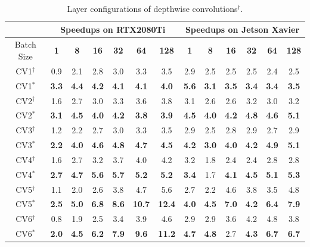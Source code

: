 \begin{table}[]
\setlength{\tabcolsep}{3.8pt}
\caption{Layer configurations of depthwise convolutions$^{\dag}$.}
\label{tab:dwconv}
\begin{threeparttable}
\begin{tabular}{c|cccccc|cccccc}
\toprule
&\multicolumn{6}{c|}{Speedups on RTX2080Ti} & \multicolumn{6}{c}{Speedups on Jetson Xavier}\\

\midrule
Batch Size& \textbf{1} & \textbf{8} & \textbf{16}& \textbf{32} & \textbf{64} & \textbf{128} & \textbf{1} & \textbf{8} & \textbf{16}& \textbf{32} & \textbf{64} & \textbf{128}\\
CV1$^{\dag}$&0.9 &2.1 &2.8 &3.0 &3.3 &3.5 &2.9 &2.5 &2.5 &2.5 &2.4 &2.5 \\
CV1$^{*}$&\textbf{3.3} &\textbf{4.4} &\textbf{4.2} &\textbf{4.1} &\textbf{4.1} &\textbf{4.0} &\textbf{5.6} &\textbf{3.1} &\textbf{3.5} &\textbf{3.4} &\textbf{3.4} &\textbf{3.5} \\
\hline
CV2$^{\dag}$&1.6 &2.7 &3.0 &3.3 &3.6 &3.8 &3.1 &2.6 &2.6 &3.2 &3.0 &3.2 \\
CV2$^{*}$&\textbf{3.1} &\textbf{4.5} &\textbf{4.0} &\textbf{4.2} &\textbf{3.8} &\textbf{3.9} &\textbf{4.5} &\textbf{4.0} &\textbf{4.2} &\textbf{4.8} &\textbf{4.6} &\textbf{5.1} \\
\hline
CV3$^{\dag}$&1.2 &2.2 &2.7 &3.0 &3.3 &3.5 &2.9 &2.5 &2.8 &2.9 &2.7 &2.9 \\
CV3$^{*}$&\textbf{2.2} &\textbf{4.0} &\textbf{4.6} &\textbf{4.8} &\textbf{4.7} &\textbf{4.5} &\textbf{4.2} &\textbf{3.0} &\textbf{4.0} &\textbf{4.2} &\textbf{4.9} &\textbf{5.1} \\
\hline
CV4$^{\dag}$&1.6 &2.7 &3.2 &3.7 &4.0 &4.2 &3.2 &1.8 &2.4 &2.4 &2.8 &2.8 \\
CV4$^{*}$&\textbf{2.7} &\textbf{4.7} &\textbf{5.6} &\textbf{5.7} &\textbf{5.2} &\textbf{5.2} &\textbf{3.4} &1.7 &\textbf{4.1} &\textbf{4.5} &\textbf{5.1} &\textbf{5.3} \\
\hline
CV5$^{\dag}$&1.1 &2.0 &2.6 &3.8 &4.7 &5.6 &2.7 &2.2 &4.6 &3.8 &3.5 &4.8 \\
CV5$^{*}$&\textbf{2.5} &\textbf{5.0} &\textbf{6.8} &\textbf{8.6} &\textbf{10.7} &\textbf{12.4} &\textbf{4.0} &\textbf{4.5} &\textbf{7.0} &\textbf{4.2} &\textbf{6.4} &\textbf{7.9} \\
\hline
CV6$^{\dag}$&0.8 &1.9 &2.5 &3.4 &3.9 &4.6 &2.9 &2.9 &3.6 &4.2 &4.8 &3.8 \\
CV6$^{*}$&\textbf{2.0} &\textbf{4.5} &\textbf{6.2} &\textbf{7.9} &\textbf{9.6} &\textbf{11.2} &\textbf{4.7} &\textbf{4.8} &2.7 &\textbf{4.3} &\textbf{6.7} &\textbf{6.7} \\

\end{tabular}
\end{threeparttable}
\end{table}
